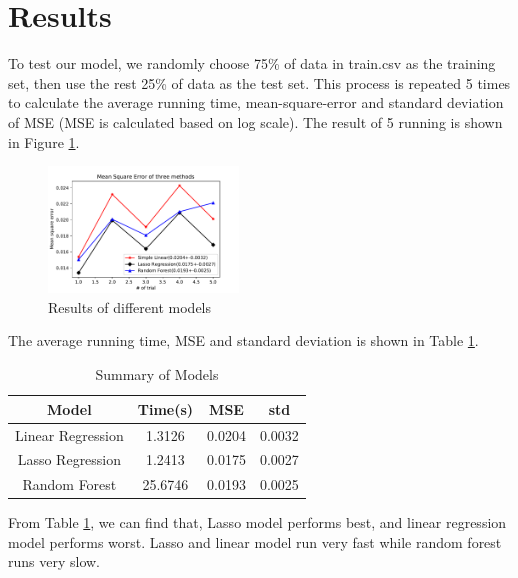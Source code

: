 \documentclass[12pt]{article}
\begin{document}
\section{Results}

To test our model, we randomly choose 75\% of data in train.csv as the training set, then use the rest 25\% of data as the test set. This process is repeated 5 times to calculate the average running time, mean-square-error and standard deviation of MSE (MSE is calculated based on log scale). The result of 5 running is shown in Figure \ref{fig:autoencoder}.

\begin{figure}[htb]
\centering
\includegraphics[width=0.45\textwidth]{./figures/MSE_3_methods.pdf}
\caption{Results of different models}
\label{fig:autoencoder}
\end{figure}

The average running time, MSE and standard deviation is shown in Table \ref{result}.

\begin{table}[htb]
 \caption{Summary of Models} \label{result}
\begin{center}
  \begin{tabular}{  c  c c  c }
    \hline
    Model                             & Time(s)              & MSE     & std \\ \hline
    Linear Regression           & 1.3126                               & 0.0204      & 0.0032 \\
    Lasso Regression                & 1.2413                          & 0.0175    & 0.0027 \\
    Random Forest                  & 25.6746                          & 0.0193          & 0.0025 \\
    \hline
  \end{tabular}
\end{center}
\end{table}

From Table \ref{result}, we can find that, Lasso model performs best, and linear regression model performs worst. Lasso and linear model run very fast while random forest runs very slow. 
\end{document}
